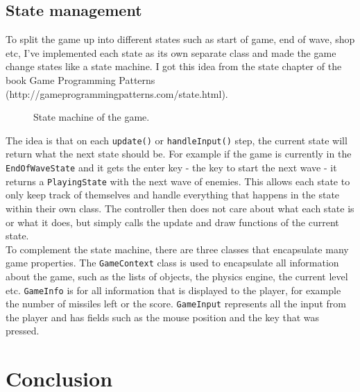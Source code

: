 \documentclass{article}
\newcommand{\n}[0]{\\[\baselineskip]}
\begin{document}
\subsection{State management}
To split the game up into different states such as start of game, end of wave, shop etc, I've implemented each state as its own separate class and made the game change states like a state machine. I got this idea from the state chapter of the book Game Programming Patterns (http://gameprogrammingpatterns.com/state.html).
\begin{figure}[H]
\caption{State machine of the game.}
\end{figure}
\noindent
The idea is that on each \texttt{update()} or \texttt{handleInput()} step, the current state will return what the next state should be. For example if the game is currently in the \texttt{EndOfWaveState} and it gets the enter key - the key to start the next wave - it returns a \texttt{PlayingState} with the next wave of enemies. This allows each state to only keep track of themselves and handle everything that happens in the state within their own class. The controller then does not care about what each state is or what it does, but simply calls the update and draw functions of the current state.
\n
To complement the state machine, there are three classes that encapsulate many game properties. The \texttt{GameContext} class is used to encapsulate all information about the game, such as the lists of objects, the physics engine, the current level etc. \texttt{GameInfo} is for all information that is displayed to the player, for example the number of missiles left or the score. \texttt{GameInput} represents all the input from the player and has fields such as the mouse position and the key that was pressed.


\section{Conclusion}

\printbibliography
\end{document}
